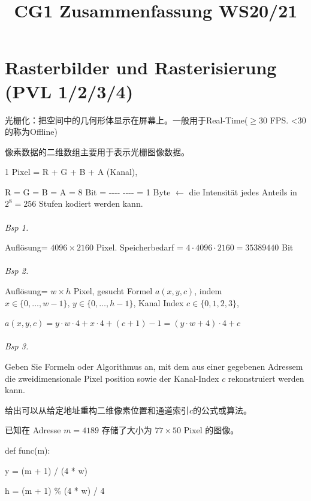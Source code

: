 \documentclass[fleqn]{article}
\title{CG1 Zusammenfassung WS20/21}
\begin{document}
\maketitle

\tableofcontents

\pagestyle{main}

\newpage

\section{Rasterbilder und Rasterisierung (PVL 1/2/3/4)}

\noindent 光栅化：把空间中的几何形体显示在屏幕上。一般用于Real-Time($\geq 30$ FPS. <30的称为Offline)

\noindent 像素数据的二维数组主要用于表示光栅图像数据。

1 Pixel = R + G + B + A (Kanal),

R = G = B = A = 8 Bit = -{}-{}-{}- -{}-{}-{}- = 1 Byte $\leftarrow$ die Intensität jedes Anteils in $2^8=256$ Stufen kodiert werden kann.
\\
\\
\noindent\textit{Bsp 1.}

Auflösung= $4096\times2160$ Pixel. Speicherbedarf = $4\cdot4096\cdot2160=3538 9440$ Bit
\\
\\
\noindent\textit{Bsp 2.}

Auflösung= $w\times h$ Pixel, gesucht Formel $a(x, y, c)$, indem $x\in\{0,\dots,w-1\},\,y\in\{0,\dots,h-1\}$, Kanal Index $c\in\{0,1,2,3\}$,

$a (x,y,c) = y\cdot w\cdot 4+x\cdot 4+(c+1)-1=(y\cdot w+4)\cdot 4 + c$
\\
\\
\noindent\textit{Bsp 3.}

Geben Sie Formeln oder Algorithmus an, mit dem aus einer gegebenen Adressem die zweidimensionale Pixel position sowie der Kanal-Index $c$ rekonstruiert werden kann. 

给出可以从给定地址重构二维像素位置和通道索引$c$的公式或算法。

已知在 Adresse $m=4189$ 存储了大小为 $77\times 50$ Pixel 的图像。

\indent\indent def func(m):

\indent\indent\indent y = (m + 1) / (4 * w)

\indent\indent\indent h = (m + 1) \% (4 * w) / 4
\end{document}
